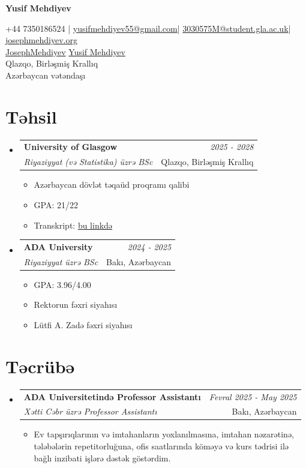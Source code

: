 \documentclass[a4paper,11pt]{article}
\makeatletter
\newcommand{\resumeSubheading}[4]{
    \vspace{-0.5mm}
\item
    \begin{tabular*}{0.98\textwidth}[t]{l@{\extracolsep{\fill}}r}
        \textbf{#1} & \textit{\footnotesize{#4}} \\
        \textit{\footnotesize{#3}} &  \footnotesize{#2}\\
    \end{tabular*}
    \vspace{-3mm}
}
\newcommand{\resumeSubHeadingListStart}{
\begin{itemize}[leftmargin=*,labelsep=1mm]}
\newcommand{\resumeItemListStart}{
                \begin{itemize}[leftmargin=*,labelsep=1mm,itemsep=0.5mm]}
\newcommand{\resumeSubHeadingListEnd}{
                    \end{itemize}\vspace{-2mm}}
\newcommand{\resumeItemListEnd}{
    \end{itemize}\vspace{-2mm}}
\newcommand{\socialicon}[1]{\raisebox{-0.05em}{\resizebox{!}{1em}{#1}}}
\makeatother
\begin{document}
\begin{center}
    {\Huge\textbf{Yusif Mehdiyev}}
\end{center}

\begin{center}
    \small{
        +44 7350186524 | \href{mailto:yusifmehdiyev55@gmail.com}{yusifmehdiyev55@gmail.com}|
        \href{mailto:3030575M@student.gla.ac.uk}{3030575M@student.gla.ac.uk}|
        \href{https://josephmehdiyev.org/}{josephmehdiyev.org}
    } \\
    \small{
        \socialicon{\faGithub} \href{https://github.com/JosephMehdiyev}{JosephMehdiyev}
        \socialicon{\faLinkedin} \href{https://www.linkedin.com/in/yusif-mehdiyev-6155982ab/} {Yusif Mehdiyev}
    }
    \\
    \small{Qlazqo, Birləşmiş Krallıq} \\
    \small{Azərbaycan vətəndaşı}
\end{center}


\section{\textbf{Təhsil}}
\resumeSubHeadingListStart
\resumeSubheading
{University of Glasgow}{Qlazqo, Birləşmiş Krallıq}
{Riyaziyyat (və Statistika) üzrə BSc}{2025 - 2028}
\resumeItemListStart
\item Azərbaycan dövlət təqaüd proqramı qalibi
\item GPA: 21/22
\item Transkript: \href{https://josephmehdiyev.org/about/coursework.pdf}{bu linkdə}

\resumeItemListEnd
\resumeSubheading
{ADA University}{Bakı, Azərbaycan}
{Riyaziyyat üzrə BSc}{2024 - 2025}
\resumeItemListStart
\item GPA: 3.96/4.00
\item Rektorun fəxri siyahısı
\item Lütfi A. Zadə fəxri siyahısı

\resumeItemListEnd
\resumeSubHeadingListEnd
\vspace{-3mm}
\section{\textbf{Təcrübə}}
\resumeSubHeadingListStart
\resumeSubheading
{{ADA Universitetində Professor Assistantı }}{Bakı, Azərbaycan}
{Xətti Cəbr üzrə Professor Assistantı}{Fevral 2025 - May 2025}
\resumeItemListStart
\item Ev tapşırıqlarının və imtahanların yoxlanılmasına, imtahan nəzarətinə, tələbələrin repetitorluğuna, ofis saatlarında köməyə və kurs tədrisi ilə bağlı inzibati işlərə dəstək göstərdim.
\resumeItemListEnd
\resumeSubHeadingListEnd
\vspace{-3mm}
\end{document}
